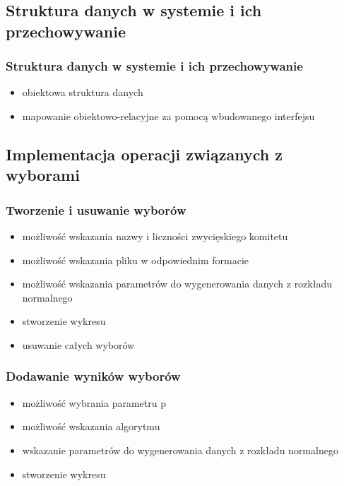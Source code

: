 \documentclass{beamer}
\begin{document}
\subsection{Struktura danych w systemie i ich przechowywanie}

\begin{frame}

\frametitle{Struktura danych w systemie i ich przechowywanie}
\begin{itemize}
\item obiektowa struktura danych
\item mapowanie obiektowo-relacyjne za pomocą wbudowanego interfejsu
\end{itemize}

\end{frame}


\subsection{Implementacja operacji związanych z wyborami}

\begin{frame}

\frametitle{Tworzenie i usuwanie wyborów}
\begin{itemize}
\item możliwość wskazania nazwy i liczności zwycięskiego komitetu
\item możliwość wskazania pliku w odpowiednim formacie
\item możliwość wskazania parametrów do wygenerowania danych z rozkładu normalnego
\item stworzenie wykresu
\item usuwanie całych wyborów 
\end{itemize}

\end{frame}


\begin{frame}

\frametitle{Dodawanie wyników wyborów}
\begin{itemize}
\item możliwość wybrania parametru p
\item możliwość wskazania algorytmu
\item wskazanie parametrów do wygenerowania danych z rozkładu normalnego
\item stworzenie wykresu 
\end{itemize}

\end{frame}
\end{document}
